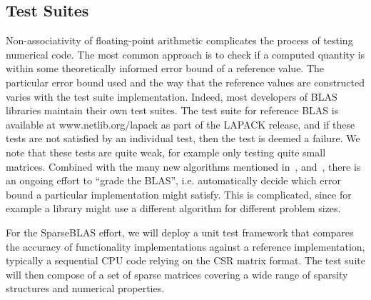 \documentclass[manuscript,review]{acmart}
\begin{document}
\subsection{Test Suites}
Non-associativity of floating-point arithmetic complicates the process of testing numerical code.
The most common approach is to check if a computed quantity is within some theoretically informed error bound of a reference value.
The particular error bound used and the way that the reference values are constructed varies with the test suite implementation.
Indeed, most developers of BLAS libraries maintain their own test suites.
The test suite for reference BLAS is available at www.netlib.org/lapack as part 
of the LAPACK release,
and if these tests are not satisfied by an individual test, then the test is deemed 
a failure. We note that these tests
are quite weak, for example only testing
quite small matrices. Combined with the
many new algorithms mentioned in~,
and~,
there is an ongoing effort to ``grade the
BLAS'', i.e. automatically decide which error
bound a particular implementation might satisfy.
This is complicated, since for example a library
might use a different algorithm for different
problem sizes.

For the SparseBLAS effort, we will deploy a unit test framework that compares the accuracy of functionality implementations against a reference implementation, typically a sequential CPU code relying on the CSR matrix format. The test suite will then compose of a set of sparse matrices covering a wide range of sparsity structures and numerical properties.

\end{document}
